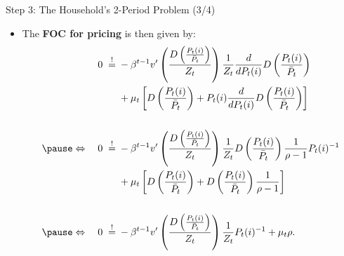 \documentclass[10pt,c,aspectratio=1610,handout]{beamer}
\begin{document}
\begin{frame}{Step 3: The Household's 2-Period Problem (3/4)}%
  \begin{itemize}%
    \item[$\blacktriangleright$] The \textbf{FOC for pricing} is then given by:%
    \begin{align*}%
      0 \; \overset{!}{=} & \; -\beta^{t-1} v^{\prime} \left( \frac{D \left( \frac{P_{t}(i)}{\bar{P}_{t}}\right)}{Z_t} \right) \frac{1}{Z_{t}} \frac{d}{dP_{t}(i)} D\left( \frac{P_{t}(i)}{\bar{P}_{t}}\right)\\%
      & \; + \mu_{t} \left[ D \left( \frac{P_{t}(i)}{\bar{P}_{t}}\right) + P_{t}(i) \frac{d}{dP_{t}(i)} D \left( \frac{P_{t}(i)}{\bar{P}_{t}}\right) \right]\\%
      \\%
      \pause%
      \Leftrightarrow \quad 0 \; \overset{!}{=} & \; -\beta^{t-1} v^{\prime}\left( \frac{ D \left( \frac{P_{t}(i)}{\bar{P}_{t}}\right)}{Z_t} \right) \frac{1}{Z_{t}} D\left( \frac{P_{t}(i)}{\bar{P}_t} \right) \frac{1}{\rho-1}P_{t}(i)^{-1}\\%
      & \; +\mu_{t} \left[ D \left( \frac{P_{t}(i)}{\bar{P}_{t}} \right) + D \left( \frac{P_{t}(i)}{\bar{P}_t} \right) \frac{1}{\rho-1} \right]\\%
      \\%
      \pause%
      \Leftrightarrow \quad 0 \; \overset{!}{=} & \; -\beta^{t-1} v^{\prime} \left( \frac{D \left( \frac{P_{t}(i)}{\bar{P}_{t}} \right)}{Z_t} \right) \frac{1}{Z_{t}} P_{t}(i)^{-1} + \mu_{t} \rho.%
    \end{align*}%
  \end{itemize}%
\end{frame}%
\end{document}
